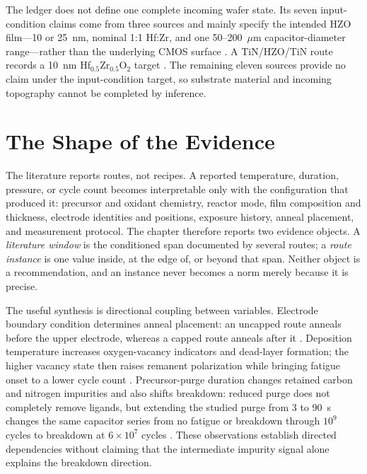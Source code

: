 \documentclass[11pt,a4paper]{report}
\begin{document}
The ledger does not define one complete incoming wafer state. Its seven input-condition claims come from three sources and mainly specify the intended HZO film---10 or 25~nm, nominal 1:1 Hf:Zr, and one 50--200~$\mu$m capacitor-diameter range---rather than the underlying CMOS surface \cite{kim2020tin,zhang2015inductive}. A TiN/HZO/TiN route records a 10~nm Hf$_{0.5}$Zr$_{0.5}$O$_2$ target \cite{tsai2022stress}. The remaining eleven sources provide no claim under the input-condition target, so substrate material and incoming topography cannot be completed by inference.

\section{The Shape of the Evidence}
\label{sec:ald-evidence-shape}

The literature reports routes, not recipes. A reported temperature, duration, pressure, or cycle count becomes interpretable only with the configuration that produced it: precursor and oxidant chemistry, reactor mode, film composition and thickness, electrode identities and positions, exposure history, anneal placement, and measurement protocol. The chapter therefore reports two evidence objects. A \emph{literature window} is the conditioned span documented by several routes; a \emph{route instance} is one value inside, at the edge of, or beyond that span. Neither object is a recommendation, and an instance never becomes a norm merely because it is precise.

The useful synthesis is directional coupling between variables. Electrode boundary condition determines anneal placement: an uncapped route anneals before the upper electrode, whereas a capped route anneals after it \cite{song2021ferro,zhang2015inductive}. Deposition temperature increases oxygen-vacancy indicators and dead-layer formation; the higher vacancy state then raises remanent polarization while bringing fatigue onset to a lower cycle count \cite{choi2022chamber}. Precursor-purge duration changes retained carbon and nitrogen impurities and also shifts breakdown: reduced purge does not completely remove ligands, but extending the studied purge from 3 to 90~s changes the same capacitor series from no fatigue or breakdown through $10^9$ cycles to breakdown at $6\times10^7$ cycles \cite{choi2025purge}. These observations establish directed dependencies without claiming that the intermediate impurity signal alone explains the breakdown direction.
\end{document}
